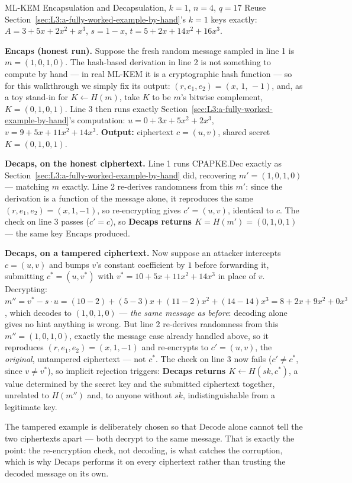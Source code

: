 \begin{exbox}{ML-KEM Encapsulation and Decapsulation, $k=1$, $n=4$, $q=17$}
Reuse Section~\ref{sec:L3:a-fully-worked-example-by-hand}'s $k=1$ keys exactly: $A=3+5x+2x^2+x^3$, $s=1-x$, $t=5+2x+14x^2+16x^3$.

\textbf{Encaps (honest run).} Suppose the fresh random message sampled in line 1 is $m=(1,0,1,0)$. The hash-based derivation in line 2 is not something to compute by hand --- in real ML-KEM it is a cryptographic hash function --- so for this walkthrough we simply fix its output: $(r,e_1,e_2)=(x,\,1,\,-1)$, and, as a toy stand-in for $K\gets H(m)$, take $K$ to be $m$'s bitwise complement, $K=(0,1,0,1)$. Line 3 then runs exactly Section~\ref{sec:L3:a-fully-worked-example-by-hand}'s computation: $u=0+3x+5x^2+2x^3$, $v=9+5x+11x^2+14x^3$. \textbf{Output:} ciphertext $c=(u,v)$, shared secret $K=(0,1,0,1)$.

\textbf{Decaps, on the honest ciphertext.} Line 1 runs CPAPKE.Dec exactly as Section~\ref{sec:L3:a-fully-worked-example-by-hand} did, recovering $m'=(1,0,1,0)$ --- matching $m$ exactly. Line 2 re-derives randomness from this $m'$: since the derivation is a function of the message alone, it reproduces the same $(r,e_1,e_2)=(x,1,-1)$, so re-encrypting gives $c'=(u,v)$, identical to $c$. The check on line 3 passes ($c'=c$), so \textbf{Decaps returns $K=H(m')=(0,1,0,1)$} --- the same key Encaps produced.

\textbf{Decaps, on a tampered ciphertext.} Now suppose an attacker intercepts $c=(u,v)$ and bumps $v$'s constant coefficient by $1$ before forwarding it, submitting $c^*=(u,v^*)$ with $v^*=10+5x+11x^2+14x^3$ in place of $v$. Decrypting: $m''=v^*-s\cdot u=(10-2)+(5-3)x+(11-2)x^2+(14-14)x^3=8+2x+9x^2+0x^3$, which decodes to $(1,0,1,0)$ --- \emph{the same message as before}: decoding alone gives no hint anything is wrong. But line 2 re-derives randomness from this $m''=(1,0,1,0)$, exactly the message case already handled above, so it reproduces $(r,e_1,e_2)=(x,1,-1)$ and re-encrypts to $c'=(u,v)$, the \emph{original}, untampered ciphertext --- not $c^*$. The check on line 3 now fails ($c'\ne c^*$, since $v\ne v^*$), so implicit rejection triggers: \textbf{Decaps returns $K\gets H(sk,c^*)$}, a value determined by the secret key and the submitted ciphertext together, unrelated to $H(m'')$ and, to anyone without $sk$, indistinguishable from a legitimate key.
\end{exbox}

The tampered example is deliberately chosen so that $\mathrm{Decode}$ alone cannot tell the two ciphertexts apart --- both decrypt to the same message. That is exactly the point: the re-encryption check, not decoding, is what catches the corruption, which is why Decaps performs it on every ciphertext rather than trusting the decoded message on its own.

